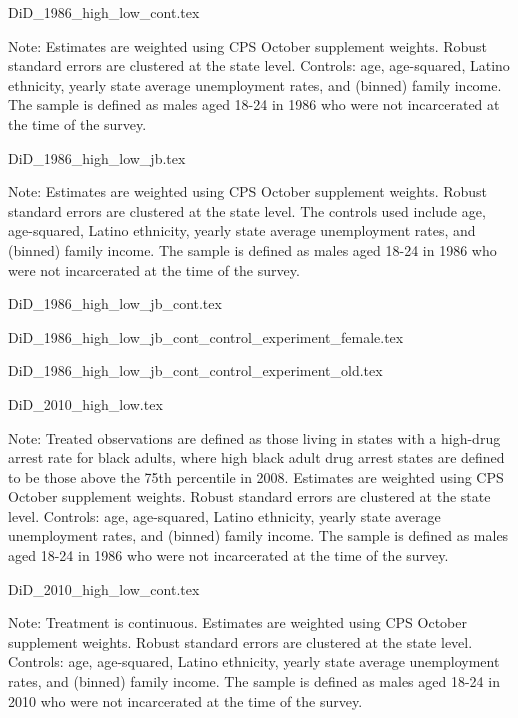 {DiD_1986_high_low_cont.tex}
\begin{footnotesize}
  \noindent Note: Estimates are weighted using CPS October supplement weights. Robust standard errors are clustered at the state level. Controls: age, age-squared, Latino ethnicity, yearly state average unemployment rates, and (binned) family income. The sample is defined as males aged 18-24 in 1986 who were not incarcerated at the time of the survey.
\end{footnotesize}
\clearpage

{DiD_1986_high_low_jb.tex}
\begin{footnotesize}
  \noindent Note: Estimates are weighted using CPS October supplement weights. Robust standard errors are clustered at the state level. The controls used include age, age-squared, Latino ethnicity, yearly state average unemployment rates, and (binned) family income. The sample is defined as males aged 18-24 in 1986 who were not incarcerated at the time of the survey.
\end{footnotesize}

{DiD_1986_high_low_jb_cont.tex}
\clearpage

{DiD_1986_high_low_jb_cont_control_experiment_female.tex}


{DiD_1986_high_low_jb_cont_control_experiment_old.tex}

\clearpage

{DiD_2010_high_low.tex}
\begin{footnotesize}
  \noindent Note: Treated observations are defined as those living in states with a high-drug arrest rate for black adults, where high black adult drug arrest states are defined to be those above the 75th percentile in 2008. Estimates are weighted using CPS October supplement weights. Robust standard errors are clustered at the state level. Controls: age, age-squared, Latino ethnicity, yearly state average unemployment rates, and (binned) family income. The sample is defined as males aged 18-24 in 1986 who were not incarcerated at the time of the survey.
\end{footnotesize}

{DiD_2010_high_low_cont.tex}
\begin{footnotesize}
  \noindent Note: Treatment is continuous. Estimates are weighted using CPS October supplement weights. Robust standard errors are clustered at the state level. Controls: age, age-squared, Latino ethnicity, yearly state average unemployment rates, and (binned) family income. The sample is defined as males aged 18-24 in 2010 who were not incarcerated at the time of the survey.
\end{footnotesize}
\clearpage

